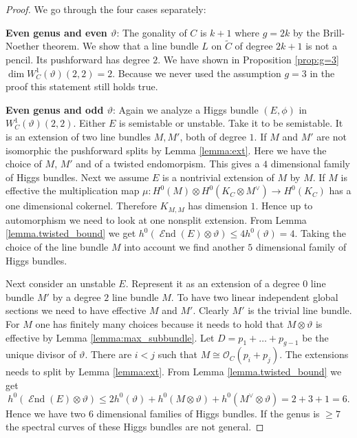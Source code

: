 \documentclass[12pt]{extarticle}
\theoremstyle{definition}
\numberwithin{theorem}{section}
\newcommand{\OO}{\mathcal{O}}
\DeclareMathOperator{\End}{\mathcal{E}nd}
\renewcommand{\tilde}{\widetilde}		%
\begin{document}
\begin{proof} We go through the four cases separately:
\medskip

\textbf{Even genus and even $\vartheta$}: The gonality of $C$ is $k+1$ where $g = 2k$ by the Brill-Noether theorem. We show that a line bundle $L$ on $\tilde{C}$ of degree $2k+1$ is not a pencil. Its pushforward has degree $2$. We have shown in Proposition \ref{prop:g=3} $\dim W^1_C(\vartheta)(2,2) = 2$. Because we never used the assumption $g = 3$ in the proof this statement still holds true.
\medskip 

\textbf{Even genus and odd $\vartheta$}:
Again we analyze a Higgs bundle $(E,\phi)$ in $W^1_C(\vartheta)(2,2)$. 
Either $E$ is semistable or unstable. Take it to be semistable. It is an extension of two line bundles $M,M'$, both of degree $1$. If $M$ and $M'$ are not isomorphic the pushforward splits by Lemma \ref{lemma:ext}. Here we have the choice of $M$, $M'$ and of a twisted endomorpism. This gives a $4$ dimensional family of Higgs bundles. Next we assume $E$ is a nontrivial extension of $M$ by $M$. If $M$ is effective the multiplication map $\mu: H^0(M) \otimes H^0(K_C\otimes M^\vee) \rightarrow H^0(K_C)$ has a one dimensional cokernel. Therefore $ K_{M,M}$ has dimension $1$. Hence up to automorphism we need to look at one nonsplit extension. From Lemma \ref{lemma.twisted_bound} we get $h^0(\End(E) \otimes \vartheta) \leq 4h^0(\vartheta) = 4$. Taking the choice of the line bundle $M$ into account we find another $5$ dimensional family of Higgs bundles. 

Next consider an unstable $E$. Represent it as an extension of a degree $0$ line bundle $M'$ by a degree $2$ line bundle $M$. To have two linear independent global sections we need to have effective $M$ and $M'$. Clearly $M'$ is the trivial line bundle. For $M$ one has finitely many choices because it needs to hold that $M\otimes \vartheta$ is effective by Lemma \ref{lemma:max_subbundle}. Let $D = p_1 + \ldots + p_{g-1}$ be the unique divisor of $\vartheta$. There are $i <j$ such that $M \cong \OO_C(p_i + p_j)$. The extensions needs to split by Lemma \ref{lemma:ext}. From Lemma \ref{lemma.twisted_bound} we get 
\begin{equation*}
h^0(\End(E) \otimes \vartheta) \leq 2h^0(\vartheta) + h^0(M \otimes \vartheta) + h^0(M^\vee \otimes \vartheta) = 2 + 3 +1 = 6.
\end{equation*}
Hence we have two $6$ dimensional families of Higgs bundles. 
If the genus is $\geq 7$ the spectral curves of these Higgs bundles are not general.
\medskip 


\end{proof}
\end{document}
